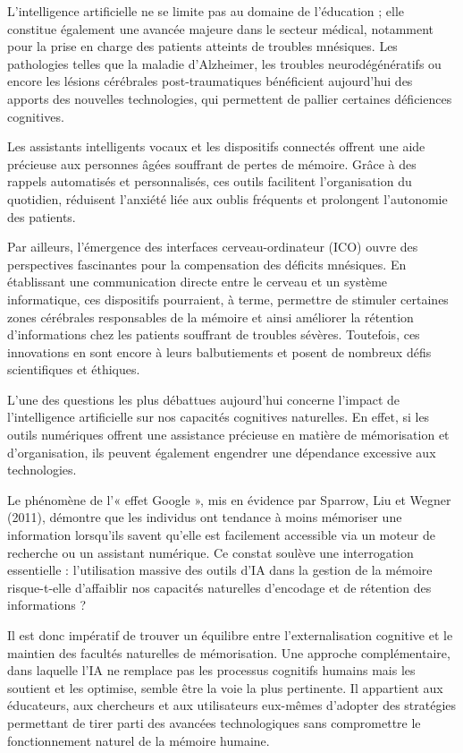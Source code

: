 \documentclass[11pt,a4paper]{report}
\begin{document}
L’intelligence artificielle ne se limite pas au domaine de l’éducation ; elle constitue également une avancée majeure dans le secteur médical, notamment pour la prise en charge des patients atteints de troubles mnésiques. Les pathologies telles que la maladie d’Alzheimer, les troubles neurodégénératifs ou encore les lésions cérébrales post-traumatiques bénéficient aujourd’hui des apports des nouvelles technologies, qui permettent de pallier certaines déficiences cognitives.

Les assistants intelligents vocaux et les dispositifs connectés offrent une aide précieuse aux personnes âgées souffrant de pertes de mémoire. Grâce à des rappels automatisés et personnalisés, ces outils facilitent l’organisation du quotidien, réduisent l’anxiété liée aux oublis fréquents et prolongent l’autonomie des patients.

Par ailleurs, l’émergence des interfaces cerveau-ordinateur (ICO) ouvre des perspectives fascinantes pour la compensation des déficits mnésiques. En établissant une communication directe entre le cerveau et un système informatique, ces dispositifs pourraient, à terme, permettre de stimuler certaines zones cérébrales responsables de la mémoire et ainsi améliorer la rétention d’informations chez les patients souffrant de troubles sévères. Toutefois, ces innovations en sont encore à leurs balbutiements et posent de nombreux défis scientifiques et éthiques.

L’une des questions les plus débattues aujourd’hui concerne l’impact de l’intelligence artificielle sur nos capacités cognitives naturelles. En effet, si les outils numériques offrent une assistance précieuse en matière de mémorisation et d’organisation, ils peuvent également engendrer une dépendance excessive aux technologies.

Le phénomène de l’« effet Google », mis en évidence par Sparrow, Liu et Wegner (2011), démontre que les individus ont tendance à moins mémoriser une information lorsqu’ils savent qu’elle est facilement accessible via un moteur de recherche ou un assistant numérique. Ce constat soulève une interrogation essentielle : l’utilisation massive des outils d’IA dans la gestion de la mémoire risque-t-elle d’affaiblir nos capacités naturelles d’encodage et de rétention des informations ?

Il est donc impératif de trouver un équilibre entre l’externalisation cognitive et le maintien des facultés naturelles de mémorisation. Une approche complémentaire, dans laquelle l’IA ne remplace pas les processus cognitifs humains mais les soutient et les optimise, semble être la voie la plus pertinente. Il appartient aux éducateurs, aux chercheurs et aux utilisateurs eux-mêmes d’adopter des stratégies permettant de tirer parti des avancées technologiques sans compromettre le fonctionnement naturel de la mémoire humaine.
\end{document}
